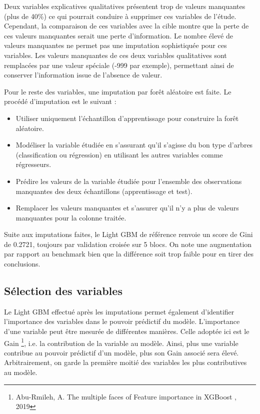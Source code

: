 \documentclass[french]{article}
\begin{document}
\begin{multicols}{2}
Deux variables explicatives  qualitatives présentent trop de valeurs manquantes (plus de 40\%) ce qui pourrait conduire à supprimer ces variables de l'étude. Cependant, la comparaison de ces variables avec la cible montre que la perte de ces valeurs manquantes serait une perte d'information. Le nombre élevé de valeurs manquantes ne permet pas une imputation sophistiquée pour ces variables. Les valeurs manquantes de ces deux variables qualitatives sont remplacées par une valeur spéciale (-999 par exemple), permettant ainsi de conserver l'information issue de l'absence de valeur.

Pour le reste des variables, une imputation par forêt aléatoire est faite. Le procédé d'imputation est le suivant :
\begin{itemize}
    \item Utiliser uniquement l'échantillon d'apprentissage pour construire la forêt aléatoire.
    \item Modéliser la variable étudiée en s'assurant qu'il s'agisse du bon type d'arbres (classification ou régression) en utilisant les autres variables comme régresseurs.
    \item Prédire les valeurs de la variable étudiée pour l'ensemble des observations manquantes des deux échantillons (apprentissage et test).
    \item Remplacer les valeurs manquantes et s'assurer qu'il n'y a plus de valeurs manquantes pour la colonne traitée.
\end{itemize}

Suite aux imputations faites, le Light GBM de référence renvoie un score de Gini de 0.2721, toujours par validation croisée sur 5 blocs. On note une augmentation par rapport au benchmark bien que la différence soit trop faible pour en tirer des conclusions.

\subsection{Sélection des variables}

Le Light GBM effectué après les imputations permet également d'identifier l'importance des variables dans le pouvoir prédictif du modèle. L'importance d'une variable peut être mesurée de différentes manières. Celle adoptée ici est le \og Gain \fg \footnote{Abu-Rmileh, A. \og The multiple faces of Feature importance in XGBoost \fg, 2019}, i.e. la contribution de la variable au modèle. Ainsi, plus une variable contribue au pouvoir prédictif d'un modèle, plus son \og Gain \fg{} associé sera élevé. Arbitrairement, on garde la première moitié des variables les plus contributives au modèle.


\end{multicols}
\end{document}
